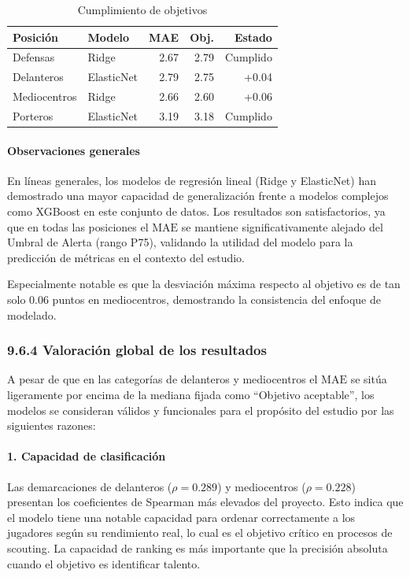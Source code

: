 \begin{table}[H]
\centering
\small
\begin{tabular}{|l|l|r|r|r|}
\hline
\textbf{Posición} & \textbf{Modelo} & \textbf{MAE} & 
\textbf{Obj.} & \textbf{Estado} \\
\hline
Defensas & Ridge & 2.67 & 2.79 & Cumplido \\
Delanteros & ElasticNet & 2.79 & 2.75 & +0.04 \\
Mediocentros & Ridge & 2.66 & 2.60 & +0.06 \\
Porteros & ElasticNet & 3.19 & 3.18 & Cumplido \\
\hline
\end{tabular}
\caption{Cumplimiento de objetivos}
\end{table}


\paragraph{Observaciones generales}

En líneas generales, los modelos de regresión lineal (Ridge y 
ElasticNet) han demostrado una mayor capacidad de generalización 
frente a modelos complejos como XGBoost en este conjunto de datos. 
Los resultados son satisfactorios, ya que en todas las posiciones 
el $\mathrm{MAE}$ se mantiene significativamente alejado 
del Umbral de Alerta (rango P75), validando la utilidad del 
modelo para la predicción de métricas en el contexto del estudio.

Especialmente notable es que la desviación máxima respecto al 
objetivo es de tan solo 0.06 puntos en mediocentros, demostrando 
la consistencia del enfoque de modelado.


\subsubsection{9.6.4 Valoración global de los resultados}

A pesar de que en las categorías de delanteros y mediocentros el 
$\mathrm{MAE}$ se sitúa ligeramente por encima de la mediana fijada 
como ``Objetivo aceptable'', los modelos se consideran 
válidos y funcionales para el propósito del estudio por 
las siguientes razones:


\paragraph{1. Capacidad de clasificación}

Las demarcaciones de delanteros ($\rho = 0.289$) y mediocentros 
($\rho = 0.228$) presentan los coeficientes de Spearman más 
elevados del proyecto. Esto indica que el modelo tiene una 
notable capacidad para ordenar correctamente a los 
jugadores según su rendimiento real, lo cual es el objetivo 
crítico en procesos de scouting. La capacidad de ranking es más 
importante que la precisión absoluta cuando el objetivo es 
identificar talento.


